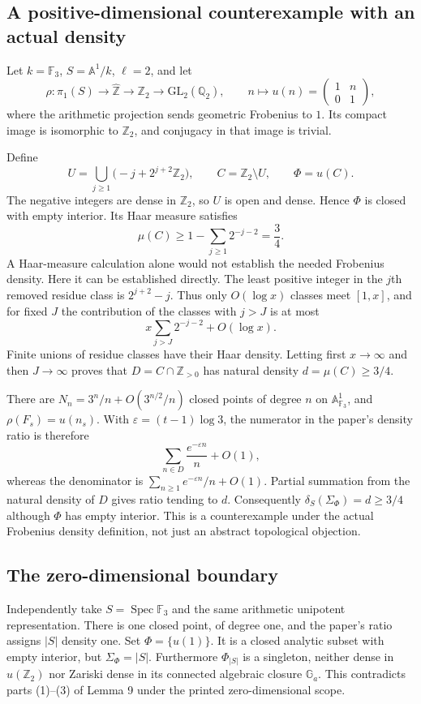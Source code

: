 \documentclass[10pt]{article}
\begin{document}
\subsection*{A positive-dimensional counterexample with an actual density}
Let \(k=\mathbb F_3\), \(S=\mathbb A^1/k\), \(\ell=2\), and let \[\rho:\pi_1(S)\longrightarrow\widehat{\mathbb Z}\longrightarrow\mathbb Z_2
   \longrightarrow\mathrm{GL}_2(\mathbb Q_2),\qquad
 n\longmapsto u(n)=
 \begin{pmatrix}1&n\\0&1\end{pmatrix},\] where the arithmetic projection sends geometric Frobenius to \(1\). Its compact image is isomorphic to \(\mathbb Z_2\), and conjugacy in that image is trivial.\par
Define \[U=\bigcup_{j\geq1}\bigl(-j+2^{j+2}\mathbb Z_2\bigr),
 \qquad C=\mathbb Z_2\setminus U,\qquad \Phi=u(C).\] The negative integers are dense in \(\mathbb Z_2\), so \(U\) is open and dense. Hence \(\Phi\) is closed with empty interior. Its Haar measure satisfies \[\mu(C)\geq1-\sum_{j\geq1}2^{-j-2}=\frac34.\] A Haar-measure calculation alone would not establish the needed Frobenius density. Here it can be established directly. The least positive integer in the \(j\)th removed residue class is \(2^{j+2}-j\). Thus only \(O(\log x)\) classes meet \([1,x]\), and for fixed \(J\) the contribution of the classes with \(j>J\) is at most \[x\sum_{j>J}2^{-j-2}+O(\log x).\] Finite unions of residue classes have their Haar density. Letting first \(x\to\infty\) and then \(J\to\infty\) proves that \(D=C\cap\mathbb Z_{>0}\) has natural density \(d=\mu(C)\geq3/4\).\par
There are \(N_n=3^n/n+O(3^{n/2}/n)\) closed points of degree \(n\) on \(\mathbb A^1_{\mathbb F_3}\), and \(\rho(F_s)=u(n_s)\). With \(\varepsilon=(t-1)\log3\), the numerator in the paper’s density ratio is therefore \[\sum_{n\in D}\frac{e^{-\varepsilon n}}n+O(1),\] whereas the denominator is \(\sum_{n\geq1}e^{-\varepsilon n}/n+O(1)\). Partial summation from the natural density of \(D\) gives ratio tending to \(d\). Consequently \(\delta_S(\Sigma_\Phi)=d\geq3/4\) although \(\Phi\) has empty interior. This is a counterexample under the actual Frobenius density definition, not just an abstract topological objection.\par
\subsection*{The zero-dimensional boundary}
Independently take \(S=\operatorname{Spec}\mathbb F_3\) and the same arithmetic unipotent representation. There is one closed point, of degree one, and the paper’s ratio assigns \(|S|\) density one. Set \(\Phi=\{u(1)\}\). It is a closed analytic subset with empty interior, but \(\Sigma_\Phi=|S|\). Furthermore \(\Phi_{|S|}\) is a singleton, neither dense in \(u(\mathbb Z_2)\) nor Zariski dense in its connected algebraic closure \(\mathbb G_a\). This contradicts parts (1)–(3) of Lemma 9 under the printed zero-dimensional scope.\par
\end{document}
